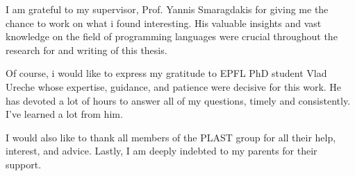 I am grateful to my supervisor, Prof. Yannis Smaragdakis for giving me the chance to work on what i found interesting. His valuable insights and vast knowledge on the field of programming languages were crucial throughout the research for and writing of this thesis.

Of course, i would like to express my gratitude to EPFL PhD student Vlad Ureche whose expertise, guidance, and patience were decisive for this work. He has devoted a lot of hours to answer all of my questions, timely and consistently. I've learned a lot from him.

I would also like to thank all members of the PLAST group for all their help, interest, and advice. Lastly, I
am deeply indebted to my parents for their support.


